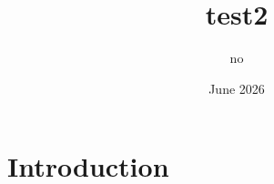 \documentclass{article}
\title{test2}
\author{no }
\date{June 2026}
\begin{document}
\maketitle

\section{Introduction}
\end{document}
